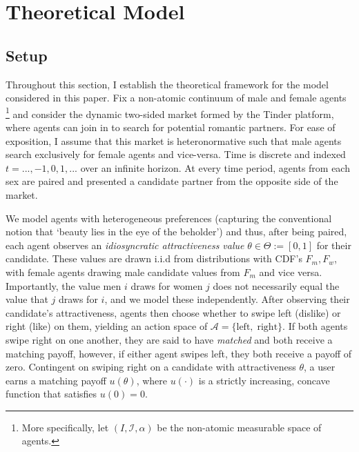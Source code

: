 \section{Theoretical Model}
\label{sec: model}
\subsection{Setup} 
Throughout this section, I establish the theoretical framework for the model considered in this paper. Fix a non-atomic continuum of male and female agents \footnote{More specifically, let  $(I, \mathcal{I}, \alpha)$ be the non-atomic measurable space of agents.} and consider the dynamic two-sided market formed by the Tinder platform, where agents can join in to search for potential romantic partners. 
For ease of exposition, I assume that this market is heteronormative such that male agents search exclusively for female agents and vice-versa. 
Time is discrete and indexed $t=..., -1, 0, 1,...$ over an infinite horizon. 
At every time period, agents from each sex are paired and presented a candidate partner from the opposite side of the market. 
\begin{comment}
    Each agent has an attractiveness type $\theta \in \Theta := [0,1]$ which is unknown to them but observable to their candidate, and it is common knowledge that this is the case.
\end{comment}
We model agents with heterogeneous preferences (capturing the conventional notion that `beauty lies in the eye of the beholder') and thus, after being paired, each agent observes an \textit{idiosyncratic attractiveness value} $\theta \in \Theta := [0,1]$ for their candidate. These values are drawn i.i.d from distributions with CDF's $F_m, F_w$, with female agents drawing male candidate values from $F_m$ and vice versa. Importantly, the value men $i$ draws for women $j$ does not necessarily equal the value that $j$ draws for $i$, and we model these independently.
After observing their candidate's attractiveness, agents then choose whether to swipe left (dislike) or right (like) on them, yielding an action space of $\mathcal{A}=\{ \text{left},\; \text{right}\}$. 
If both agents swipe right on one another, they are said to have \textit{matched} and both receive a matching payoff, however, if either agent swipes left, they both receive a payoff of zero. Contingent on swiping right on a candidate with attractiveness $\theta$, a user earns a matching payoff $u(\theta)$, where $u(\cdot)$ is a strictly increasing, concave function that satisfies $u(0) = 0$. 
